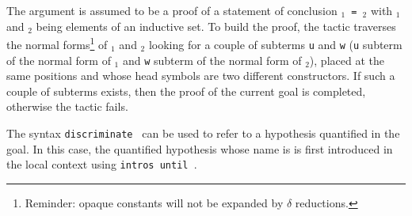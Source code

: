 \begin{coq_example*}
The argument {\term} is assumed to be a proof of a statement
of conclusion {\tt{\term$_1$} = {\term$_2$}} with {\term$_1$} and
{\term$_2$} being elements of an inductive set.  To build the proof,
the tactic traverses the normal forms\footnote{Reminder: opaque
  constants will not be expanded by $\delta$ reductions.} of
{\term$_1$} and {\term$_2$} looking for a couple of subterms {\tt u}
and {\tt w} ({\tt u} subterm of the normal form of {\term$_1$} and
{\tt w} subterm of the normal form of {\term$_2$}), placed at the same
positions and whose head symbols are two different constructors. If
such a couple of subterms exists, then the proof of the current goal
is completed, otherwise the tactic fails.

\Rem The syntax {\tt discriminate {\ident}} can be used to refer to a
hypothesis quantified in the goal. In this case, the quantified
hypothesis whose name is {\ident} is first introduced in the local
context using \texttt{intros until \ident}.

\begin{ErrMsgs}
\item {}
\item {}
\end{ErrMsgs}

\end{coq_example*}
